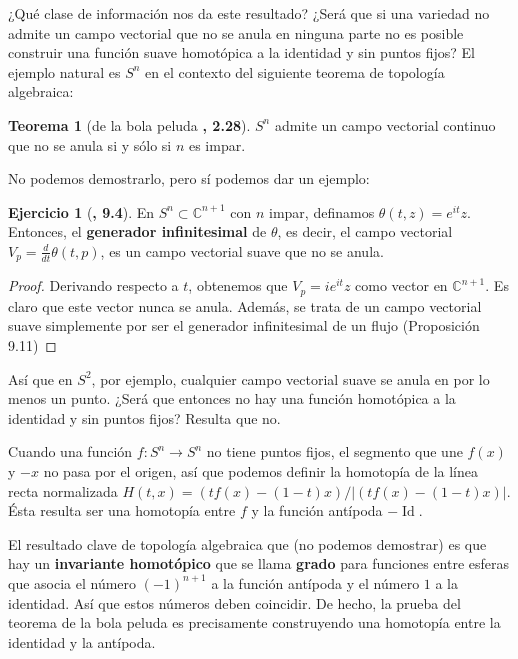 \documentclass[spanish]{book}
\theoremstyle{definition}
\newtheorem*{teo}{Teorema}
\newtheorem*{ejer*}{Ejercicio}
\newcommand{\C}{\mathbb{C}}
\DeclareMathOperator{\Id}{Id}
\begin{document}
	¿Qué clase de información nos da este resultado? ¿Será que si una variedad no admite un campo vectorial que no se anula en ninguna parte no es posible construir una función suave homotópica a la identidad y sin puntos fijos? El ejemplo natural es $S^n$ en el contexto del siguiente teorema de topología algebraica:
	\begin{teo}[de la bola peluda \cite{Hatcher}\textbf{, 2.28}]
		$S^n$ admite un campo vectorial continuo que no se anula si y sólo si $n$ es impar.
	\end{teo}
	No podemos demostrarlo, pero sí podemos dar un ejemplo:
		\begin{ejer*}[\cite{Lee}\textbf{, 9.4}]
		En $S^n\subset\C^{n+1}$ con $n$ impar, definamos $\theta(t,z)=e^{it}z$. Entonces, el \textbf{generador infinitesimal} de $\theta$, es decir, el campo vectorial $V_p=\frac{d}{dt}\theta(t,p)$, es un campo vectorial suave que no se anula.
	\end{ejer*}
	\begin{proof}
		Derivando respecto a $t$, obtenemos que $V_p=ie^{it}z$ como vector en $\C^{n+1}$. Es claro que este vector nunca se anula. Además, se trata de un campo vectorial suave simplemente por ser el generador infinitesimal de un flujo (Proposición 9.11)
	\end{proof}
	Así que en $S^2$, por ejemplo, cualquier campo vectorial suave se anula en por lo menos un punto. ¿Será que entonces no hay una función homotópica a la identidad y sin puntos fijos? Resulta que no.
	
	Cuando una función ${f:S^n\to S^n}$ no tiene puntos fijos, el segmento que une $f(x)$ y $-x$ no pasa por el origen, así que podemos definir la homotopía de la línea recta normalizada $H(t,x)=(tf(x)-(1-t)x)/|(tf(x)-(1-t)x)|$. Ésta resulta ser una homotopía entre $f$ y la función antípoda $-\Id$.
	
	El resultado clave de topología algebraica que (no podemos demostrar) es que hay un \textbf{invariante homotópico }que se llama \textbf{grado} para funciones entre esferas que asocia el número $(-1)^{n+1}$ a la función antípoda y el número $1$ a la identidad. Así que estos números deben coincidir. De hecho, la prueba del teorema de la bola peluda es precisamente construyendo una homotopía entre la identidad y la antípoda.
\end{document}
